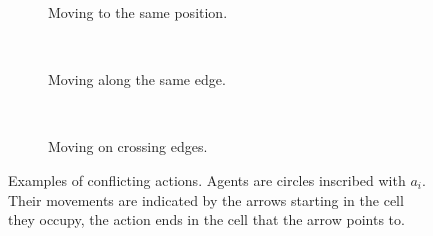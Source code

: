\begin{figure}[t]
    \centering
    \begin{subfigure}[b]{.25\textwidth}
        \centering
        \def\svgscale{.55}
        
        \caption{Moving to the same position.}
        \label{fig:conflict-position}
    \end{subfigure}
    ~
    \begin{subfigure}[b]{.25\textwidth}
        \centering
        \def\svgscale{.55}
        
        \caption{Moving along the same edge.}
        \label{fig:conflict-same}
    \end{subfigure}
    ~
    \begin{subfigure}[b]{.25\textwidth}
        \centering
        \def\svgscale{.55}
        
        \caption{Moving on crossing edges.}
        \label{fig:conflict-crossing}
    \end{subfigure}
    \caption{Examples of conflicting actions. Agents are circles inscribed with
        $a_i$. Their movements are indicated by the arrows starting in the cell
        they occupy, the action ends in the cell that the arrow points to.}
    \label{fig:conflicts}
\end{figure}